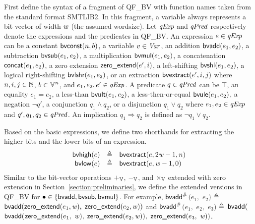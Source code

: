 
First define the syntax of a fragment of QF\_BV with function names taken from the standard format SMTLIB2.
In this fragment, a variable always represents a bit-vector of width $\mathit{w}$ (the assumed wordsize).
Let $\mathit{qExp}$ and $\mathit{qPred}$ respectively denote the expressions and the predicates in QF\_BV.
An expression $e \in \mathit{qExp}$ can be a constant $\mbox{\textsf{bvconst}}(n, b)$, a variiable $v \in \mathit{Var}$, an addition $\mbox{\textsf{bvadd}}(e_1, e_2)$, a subtraction $\mbox{\textsf{bvsub}}(e_1, e_2)$, a multiplication $\mbox{\textsf{bvmul}}(e_1, e_2)$, a concatenation $\mbox{\textsf{concat}}(e_1, e_2)$, a zero extension $\mbox{\textsf{zero\_extend}}(e', i)$, a left-shifting $\mbox{\textsf{bvshl}}(e_1, e_2)$, a logical right-shifting $\mbox{\textsf{bvlshr}}(e_1, e_2)$, or an extraction $\mbox{\textsf{bvextract}}(e', i, j)$ where $n, i, j \in \mathbb{N}$, $b \in \mathbb{V}^n$, and $e_1, e_2, e' \in \mathit{qExp}$.
A predicate $q \in \mathit{qPred}$ can be $\top$, an equality $e_1 = e_2$, a less-than $\mbox{\textsf{bvult}}(e_1, e_2)$, a less-then-or-equal $\mbox{\textsf{bvule}}(e_1, e_2)$, a negation $\neg q'$, a conjunction $q_1 \wedge q_2$, or a disjunction $q_1 \vee q_2$ where $e_1, e_2 \in \mathit{qExp}$ and $q', q_1, q_2 \in \mathit{qPred}$.
An implication $q_1 \Rightarrow q_2$ is defined as $\neg q_1 \vee q_2$.

Based on the basic expressions, we define two shorthands for extracting the higher bits and the lower bits of an expression.
\[
\begin{array}{rcl}
\mbox{\textsf{bvhigh}}(e) & \triangleq & \mbox{\textsf{bvextract}}(e, 2\mathit{w} - 1, n) \\
\mbox{\textsf{bvlow}}(e) & \triangleq & \mbox{\textsf{bvextract}}(e, \mathit{w} - 1, 0) \\
\end{array}
\]
Similar to the bit-vector operations $+_{\mathbb{V}}$, $-_{\mathbb{V}}$, and $\times_{\mathbb{V}}$ extended with zero extension in Section~\ref{section:preliminaries}, we define the extended versions in QF\_BV for $\bullet \in \{\mbox{\textsf{bvadd}}, \mbox{\textsf{bvsub}}, \mbox{\textsf{bvmul}}\}$.
For example, $\mbox{\textsf{bvadd}}^{\#}$$(e_1,$ $e_2)$ $\triangleq$ $\mbox{\textsf{bvadd}}(\mbox{\textsf{zero\_extend}}(e_1, \mathit{w}),$ $\mbox{\textsf{zero\_extend}}(e_2, \mathit{w}))$ and $\mbox{\textsf{bvadd}}^{\#}$$(e_1,$ $e_2,$ $e_3)$ $\triangleq$ $\mbox{\textsf{bvadd}}($$\mbox{\textsf{bvadd}}($$\mbox{\textsf{zero\_extend}}(e_1,$ $\mathit{w}),$ $\mbox{\textsf{zero\_extend}}(e_2, \mathit{w})),$ $\mbox{\textsf{zero\_extend}}(e_3,$ $\mathit{w}))$.

